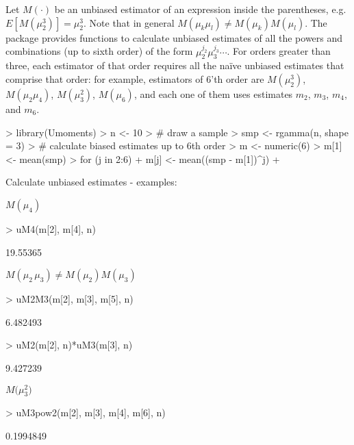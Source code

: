\documentclass[12pt]{article}
\begin{document}
\begin{sloppypar}
Let $M(\cdot)$ be an unbiased estimator of an expression inside the parentheses, e.g. $E\left[M(\mu_2^3)\right] = \mu_2^3$. Note that in general $M(\mu_k \mu_l) \neq M(\mu_k) M(\mu_l)$. The package provides functions to calculate unbiased estimates of all the powers and combinations (up to sixth order) of the form $\mu_2^{j_2} \mu_3^{j_3} \dotsm$. For orders greater than three, each estimator of that order requires all the na\"ive unbiased estimates that comprise that order: for example, estimators of $6$'th order are $M(\mu_2^3)$, $M(\mu_2 \mu_4)$, $M(\mu_3^2)$, $M(\mu_6)$, and each one of them uses estimates $m_2$, $m_3$, $m_4$, and $m_6$.
\end{sloppypar}

\begin{Schunk}
\begin{Sinput}
> library(Umoments)
> n <- 10
> # draw a sample
> smp <- rgamma(n, shape = 3)
> # calculate biased estimates up to 6th order
> m <- numeric(6)
> m[1] <- mean(smp)
> for (j in 2:6) {
+   m[j] <- mean((smp - m[1])^j)
+ }
\end{Sinput}
\end{Schunk}

Calculate unbiased estimates - examples:

$M(\mu_4)$
\begin{Schunk}
\begin{Sinput}
> uM4(m[2], m[4], n)
\end{Sinput}
\begin{Soutput}
[1] 19.55365
\end{Soutput}
\end{Schunk}
$M(\mu_2 \, \mu_3) \neq M(\mu_2) M(\mu_3)$
\begin{Schunk}
\begin{Sinput}
> uM2M3(m[2], m[3], m[5], n)
\end{Sinput}
\begin{Soutput}
[1] 6.482493
\end{Soutput}
\begin{Sinput}
> uM2(m[2], n)*uM3(m[3], n)
\end{Sinput}
\begin{Soutput}
[1] 9.427239
\end{Soutput}
\end{Schunk}
$M\big(\mu_3^2\big)$
\begin{Schunk}
\begin{Sinput}
> uM3pow2(m[2], m[3], m[4], m[6], n)
\end{Sinput}
\begin{Soutput}
[1] 0.1994849
\end{Soutput}
\end{Schunk}
\end{document}
